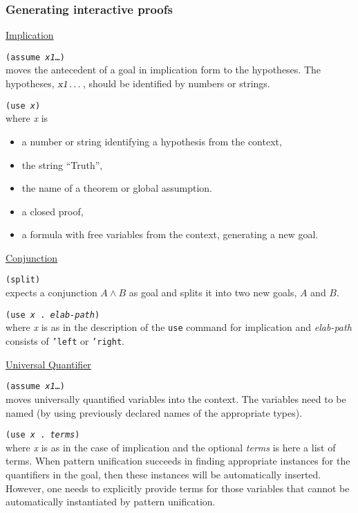 \documentclass[12pt]{amsart}
\newcommand{\inquotes}[1]{``#1''}
\begin{document}
\begin{appendix}
\subsubsection{Generating interactive proofs}
\underline{Implication}

\texttt{(assume \textsl{x1}\dots)}\\
moves the antecedent of a goal in implication form to
the hypotheses. The hypotheses,  $\textsl{x1}\dots$,
should be identified by numbers
or strings.

\texttt{(use \textsl{x})}\\
where \textsl{x} is
\begin{itemize}
\item a number or string identifying a hypothesis from the context,
\item the string \inquotes{Truth},
\item the name of a theorem or global assumption.
\item a closed proof,
\item a formula with free variables from the context, generating a new
  goal.
\end{itemize}

\underline{Conjunction}

\texttt{(split)}\\
expects a conjunction $A \land B$ as goal and splits it into
two new goals, $A$ and $B$.

\texttt{(use \textsl{x} . \textsl{elab-path})}\\
where \textsl{x} is as in the description of the \texttt{use}
command for implication and \textsl{elab-path} consists of \texttt{'left}
or \texttt{'right}.

\underline{Universal Quantifier}

\texttt{(assume \textsl{x1}\dots)}\\
moves universally quantified variables into the context.  The variables
need to be named (by using previously declared names of
the appropriate types).

\texttt{(use \textsl{x} . \textsl{terms})}\\
where \textsl{x} is as in the case of implication and the optional
\textsl{terms} is here a list of terms.  When pattern unification
succeeds in finding appropriate instances for the quantifiers in the
goal, then these instances will be automatically inserted.  However,
one needs to explicitly provide terms for those variables that cannot
be automatically instantiated by pattern
unification.


\end{appendix}
\end{document}
